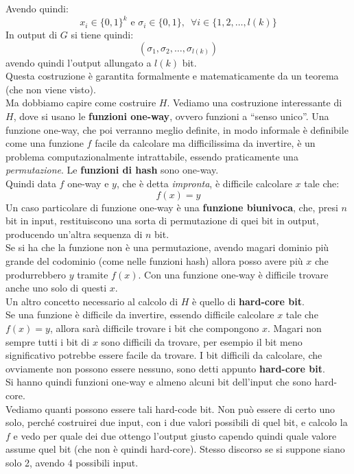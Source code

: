\documentclass[a4paper,12pt, oneside]{book}
\begin{document}
Avendo quindi:
\[x_i\in\{0,1\}^k\mbox{ e }\sigma_i\in\{0,1\},\,\,\,\forall i\in\{1,2,\ldots,
  l(k)\}\]
In output di $G$ si tiene quindi:
\[(\sigma_1,\sigma_2,\ldots, \sigma_{l(k)})\]
avendo quindi l'output allungato a $l(k)$ bit.\\
Questa costruzione è garantita formalmente e matematicamente da un teorema (che
non viene visto).\\
Ma dobbiamo capire come costruire $H$. Vediamo una costruzione interessante di
$H$, dove si usano le \textbf{funzioni one-way}, ovvero funzioni a ``senso
unico''. Una funzione one-way, che poi verranno meglio definite, in modo
informale è definibile come una funzione $f$ facile da calcolare ma
difficilissima da invertire, è un problema computazionalmente intrattabile,
essendo praticamente una \textit{permutazione}. Le
\textbf{funzioni di hash} sono one-way.\\
Quindi data $f$ one-way e $y$, che è detta \textit{impronta}, è difficile
calcolare $x$ tale che: 
\[f(x)=y\]
Un caso particolare di funzione one-way è una \textbf{funzione biunivoca}, che,
presi $n$ bit in input, restituiscono una sorta di permutazione di quei bit in
output, producendo un'altra sequenza di $n$ bit.\\
Se si ha che la funzione non è una permutazione, avendo magari dominio più
grande del codominio (come nelle funzioni hash) allora posso avere più $x$ che
produrrebbero $y$ tramite $f(x)$. Con una funzione one-way è difficile trovare
anche uno solo di questi $x$.\\
Un altro concetto necessario al calcolo di $H$ è quello di \textbf{hard-core
  bit}. \\
Se una funzione è difficile da invertire, essendo difficile calcolare $x$ tale
che $f(x)=y$, allora sarà difficile trovare i bit che compongono $x$. Magari non
sempre tutti i bit di $x$ sono difficili da trovare, per esempio il bit meno
significativo potrebbe essere facile da trovare. I bit difficili da calcolare,
che ovviamente non possono essere nessuno, sono detti appunto \textbf{hard-core
  bit}. \\
Si hanno quindi funzioni one-way e almeno alcuni bit dell'input che sono
hard-core. \\
Vediamo quanti possono essere tali hard-code bit. Non può essere di certo uno
solo, perché costruirei due input, con i due valori possibili di quel bit, e
calcolo la $f$ e vedo per quale dei due ottengo l'output giusto capendo quindi
quale valore assume quel bit (che non è quindi hard-core). Stesso discorso se si
suppone siano solo 2, avendo 4 possibili input.\\
\end{document}
